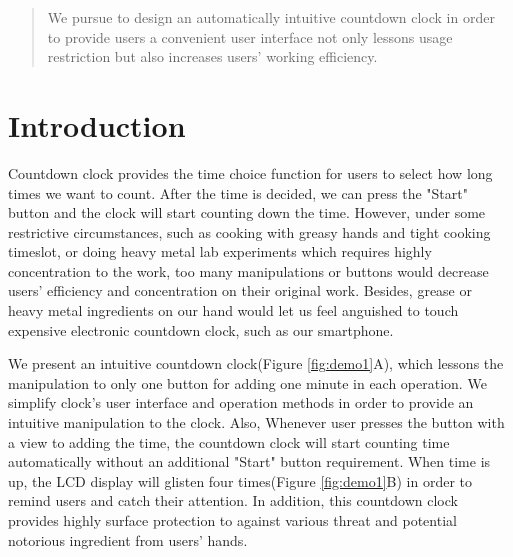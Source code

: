 \documentclass{sig-alternate-ipsn13}
\begin{document}

\maketitle
\begin{abstract}
We pursue to design an automatically intuitive countdown clock in order to provide users a convenient user interface not only lessons usage restriction but also increases users' working efficiency.

\end{abstract}

\section{Introduction}

Countdown clock provides the time choice function for users to select how long times we want to count. After the time is decided, we can press the "Start" button and the clock will start counting down the time. However, under some restrictive circumstances, such as cooking with greasy hands and tight cooking timeslot, or doing heavy metal lab experiments which requires highly concentration to the work, 
too many manipulations or buttons would decrease users' efficiency and concentration on their original work. Besides, grease or heavy metal ingredients on our hand would let us feel anguished to touch expensive electronic countdown clock, such as our smartphone. 

We present an intuitive countdown clock(Figure \ref{fig:demo1}A), which lessons the manipulation to only one button for adding one minute in each operation. We simplify clock's user interface and operation methods in order to provide an intuitive manipulation to the clock. Also, Whenever user presses the button with a view to adding the time, the countdown clock will start counting time automatically without an additional "Start" button requirement. When time is up, the LCD display will glisten four times(Figure \ref{fig:demo1}B) in order to remind users and catch their attention. In addition, this countdown clock provides highly surface protection to against various threat and potential notorious ingredient from users' hands. 
\end{document}
